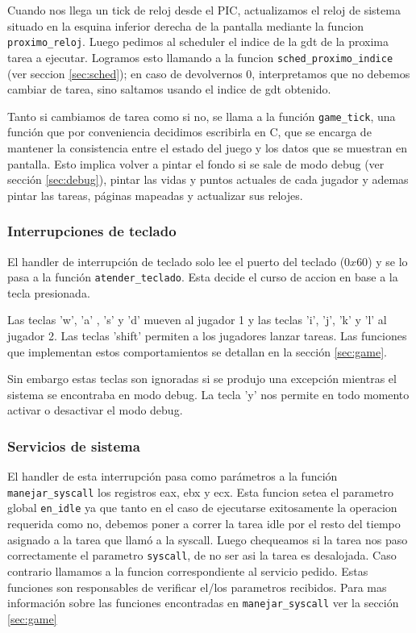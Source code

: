 \label{subsec:int-reloj}

Cuando nos llega un tick de reloj desde el PIC, actualizamos el reloj de sistema situado en la esquina inferior derecha de la pantalla mediante la funcion \verb|proximo_reloj|. Luego pedimos al scheduler el indice de la gdt de la proxima tarea a ejecutar. Logramos esto llamando a la funcion \verb|sched_proximo_indice| (ver seccion \ref{sec:sched}); en caso de devolvernos 0, interpretamos que no debemos cambiar de tarea, sino saltamos usando el indice de gdt obtenido.

Tanto si cambiamos de tarea como si no, se llama a la función \verb|game_tick|, una función que por conveniencia decidimos escribirla en C, que se encarga de mantener la consistencia entre el estado del juego y los datos que se muestran en pantalla. 
Esto implica volver a pintar el fondo si se sale de modo debug (ver sección \ref{sec:debug}), pintar las vidas y puntos actuales de cada jugador y ademas pintar las tareas, p\'aginas mapeadas y actualizar sus relojes.



\subsubsection{Interrupciones de teclado}
\label{subsec:int-teclado}
El handler de interrupción de teclado solo lee el puerto del teclado ($0x60$) y se lo pasa a la función \verb|atender_teclado|. Esta decide el curso de accion en base a la tecla presionada. 

Las teclas 'w', 'a' , 's' y 'd' mueven al jugador 1 y las teclas 'i', 'j', 'k' y 'l' al jugador 2. Las teclas 'shift' permiten a los jugadores lanzar tareas. Las funciones que implementan estos comportamientos se detallan en la sección \ref{sec:game}. 

Sin embargo estas teclas son ignoradas si se produjo una excepción mientras el sistema se encontraba en modo debug. La tecla 'y' nos permite en todo momento activar o desactivar el modo debug.


\subsubsection{Servicios de sistema}

El handler de esta interrupción pasa como parámetros a la función \verb|manejar_syscall| los registros eax, ebx y ecx. Esta funcion setea el parametro global \verb|en_idle| ya que tanto en el caso de ejecutarse exitosamente la operacion requerida como no, debemos poner a correr la tarea idle por el resto del tiempo asignado a la tarea que llamó a la syscall. Luego chequeamos si la tarea nos paso correctamente el parametro \verb|syscall|, de no ser asi la tarea es desalojada. Caso contrario llamamos a la funcion correspondiente al servicio pedido. Estas funciones son responsables de verificar el/los parametros recibidos.
Para mas información sobre  las funciones encontradas en \verb|manejar_syscall| ver la sección \ref{sec:game}

